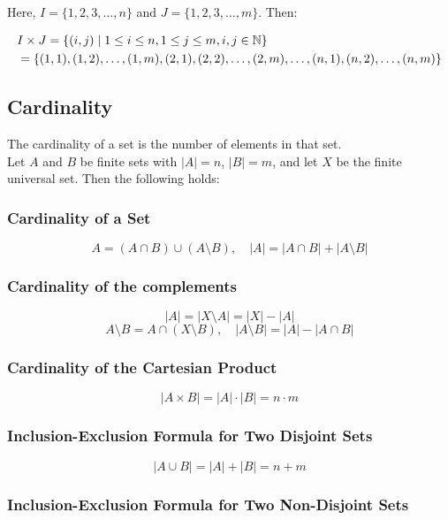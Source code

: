 Here, \( I = \{ 1, 2, 3, \dots, n \} \) and \( J = \{ 1, 2, 3, \dots, m \} \). Then:

\begin{align*}
&I \times J = \{ (i, j) \mid 1 \leq i \leq n, 1 \leq j \leq m, i, j \in \mathbb{N} \} \\
&= \{ (1, 1), (1, 2), \dots, (1, m), (2, 1), (2, 2), \dots, (2, m), \dots, (n, 1), (n, 2), \dots, (n, m) \}
\end{align*}

\subsection{Cardinality}

The cardinality of a set is the number of elements in that set.
\\
Let \( A \) and \( B \) be finite sets with \( |A| = n \), \( |B| = m \), and let \( X \) be the finite 
universal set. Then the following holds:

\subsubsection{Cardinality of a Set}
\[
	A = (A \cap B) \cup (A \setminus B), \quad |A| = |A \cap B| + |A \setminus B|
\]

\subsubsection{Cardinality of the complements}
\[
	|A| = |X \setminus A| = |X| - |A|
\]
\[
	A \setminus B = A \cap (X \setminus B), \quad |A \setminus B| = |A| - |A \cap B|
\]

\subsubsection{Cardinality of the Cartesian Product}

\[
	|A \times B| = |A| \cdot |B| = n \cdot m
\]

\subsubsection{Inclusion-Exclusion Formula for Two Disjoint Sets}

\[
	|A \cup B| = |A| + |B| = n + m
\]

\subsubsection{Inclusion-Exclusion Formula for Two Non-Disjoint Sets}


